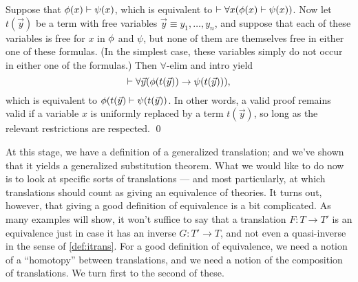 \begin{example} Suppose that $\phi (x)\vdash \psi (x)$, which is
  equivalent to $\vdash \forall x(\phi (x)\vdash \psi (x))$.  Now let
  $t(\vec{y})$ be a term with free variables
  $\vec{y}\equiv y_1,\dots ,y_n$, and suppose that each of these
  variables is free for $x$ in $\phi$ and $\psi$, but none of them are
  themselves free in either one of these formulas.  (In the simplest
  case, these variables simply do not occur in either one of the
  formulas.)  Then $\forall$-elim and intro yield
  $$ \vdash \forall \vec{y} (\phi (t(\vec{y}))\to \psi (t(\vec{y} )) ) ,$$
  which is equivalent to $\phi (t(\vec{y})\vdash \psi (t(\vec{y}))$.
  In other words, a valid proof remains valid if a variable $x$ is
  uniformly replaced by a term $t(\vec{y})$, so long as the relevant
  restrictions are respected. \hfill \qed
\end{example}


At this stage, we have a definition of a generalized translation; and
we've shown that it yields a generalized substitution theorem.  What
we would like to do now is to look at specific sorts of translations
--- and most particularly, at which translations should count as
giving an equivalence of theories.  It turns out, however, that giving
a good definition of equivalence is a bit complicated.  As many
examples will show, it won't suffice to say that a translation
$F:T\to T'$ is an equivalence just in case it has an inverse
$G:T'\to T$, and not even a quasi-inverse in the sense of
\ref{def:itrans}.  For a good definition of equivalence, we need a
notion of a ``homotopy'' between translations, and we need a notion of
the composition of translations.  We turn first to the second of
these.

